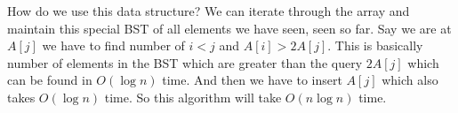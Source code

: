 \documentclass[12pt]{report}
\begin{document}
\begin{enumerate}[label=\textbf{\arabic*.}]
  How do we use this data structure? We can iterate through the array and maintain this special BST of all elements we have seen, 
  seen so far. Say we are at $A[j]$ we have to find number of $i < j$ and $A[i] > 2A[j]$. This is basically number of elements in the 
  BST which are greater than the query $2A[j]$ which can be found in $O(\log n)$ time. And then we have to insert $A[j]$ which also takes
  $O(\log n)$ time.
  So this algorithm will take $O(n \log n)$ time.

  \end{enumerate}
\end{document}

